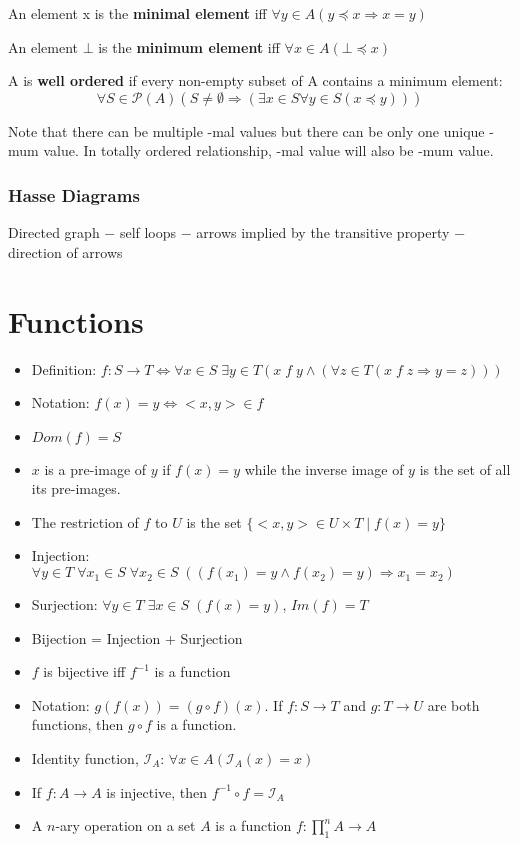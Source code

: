 \documentclass[11pt, twocolumn]{article}
\newenvironment{compactitem}
{\begin{itemize}
  \setlength{\itemsep}{1px}
  \setlength{\parskip}{0pt}
  \setlength{\parsep}{0pt}}
{\end{itemize}}
\begin{document}
An element x is the \textbf{minimal element} iff $\forall y\in A(y\preceq x\Rightarrow x=y)$

An element $\bot$ is the \textbf{minimum element} iff $\forall x\in A(\bot\preceq x)$

A is \textbf{well ordered} if every non-empty subset of A contains a minimum element:
$$\forall S\in\mathcal{P}(A)(S\neq\emptyset\Rightarrow(\exists x\in S\forall y\in S(x\preceq y)))$$

Note that there can be multiple -mal values but there can be only one unique -mum value. In totally ordered relationship, -mal value will also be -mum value.
\subsubsection{Hasse Diagrams}
Directed graph $-$ self loops $-$ arrows implied by the transitive property $-$ direction of arrows
\section{Functions}
\begin{compactitem}
\item Definition: $f: S \rightarrow T \Leftrightarrow \forall x \in S \;\exists y \in T (x\;f\;y \wedge (\forall z \in T (x\;f\;z \Rightarrow y=z)))$
\item Notation: $f(x)=y \Leftrightarrow <x,y>\in f$
\item $Dom(f) = S$
\item $x$ is a pre-image of $y$ if $f(x)=y$ while the inverse image of $y$ is the set of all its pre-images.
\item The restriction of $f$ to $U$ is the set $\{<x,y>\in U\times T\;|\;f(x)=y\}$
\item Injection: $\forall y \in T \;\forall x_1 \in S \;\forall x_2 \in S \;((f(x_1)=y\wedge f(x_2)=y)\Rightarrow x_1=x_2)$ 
\item Surjection: $\forall y \in T \; \exists x \in S \; (f(x)=y)$, $Im(f)=T$
\item Bijection = Injection + Surjection
\item $f$ is bijective iff $f^{-1}$ is a function
\item Notation: $g(f(x)) = (g\circ f)(x)$. If $f: S \rightarrow T$ and $g: T \rightarrow U$ are both functions, then $g\circ f$ is a function.
\item Identity function, $\mathcal{I}_A$: $\forall x \in A (\mathcal{I}_A(x)=x)$ 
\item If $f: A \rightarrow A$ is injective, then $f^{-1} \circ f = \mathcal{I}_A$
\item A $n$-ary operation on a set $A$ is a function $f: \prod^n_1A\rightarrow A$
\end{compactitem}
\end{document}
